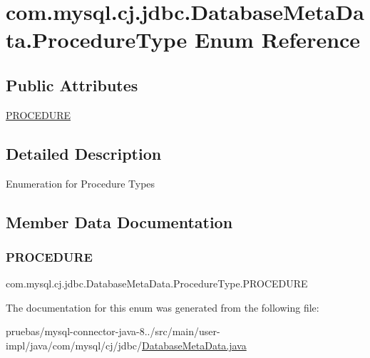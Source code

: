 \hypertarget{enumcom_1_1mysql_1_1cj_1_1jdbc_1_1_database_meta_data_1_1_procedure_type}{}\section{com.\+mysql.\+cj.\+jdbc.\+Database\+Meta\+Data.\+Procedure\+Type Enum Reference}
\label{enumcom_1_1mysql_1_1cj_1_1jdbc_1_1_database_meta_data_1_1_procedure_type}
\subsection*{Public Attributes}
\begin{DoxyCompactItemize}
\item 
\mbox{\hyperlink{enumcom_1_1mysql_1_1cj_1_1jdbc_1_1_database_meta_data_1_1_procedure_type_a0ecc121f88388c4fab170d804c8552ce}{P\+R\+O\+C\+E\+D\+U\+RE}}
\end{DoxyCompactItemize}


\subsection{Detailed Description}
Enumeration for Procedure Types 

\subsection{Member Data Documentation}
\mbox{\label{enumcom_1_1mysql_1_1cj_1_1jdbc_1_1_database_meta_data_1_1_procedure_type_a0ecc121f88388c4fab170d804c8552ce}} 
\subsubsection{\texorpdfstring{P\+R\+O\+C\+E\+D\+U\+RE}{PROCEDURE}}
{\footnotesize\ttfamily com.\+mysql.\+cj.\+jdbc.\+Database\+Meta\+Data.\+Procedure\+Type.\+P\+R\+O\+C\+E\+D\+U\+RE}



The documentation for this enum was generated from the following file\+:\begin{DoxyCompactItemize}
\item 
pruebas/mysql-\/connector-\/java-\/8../src/main/user-\/impl/java/com/mysql/cj/jdbc/\mbox{\hyperlink{_database_meta_data_8java}{Database\+Meta\+Data.\+java}}\end{DoxyCompactItemize}
